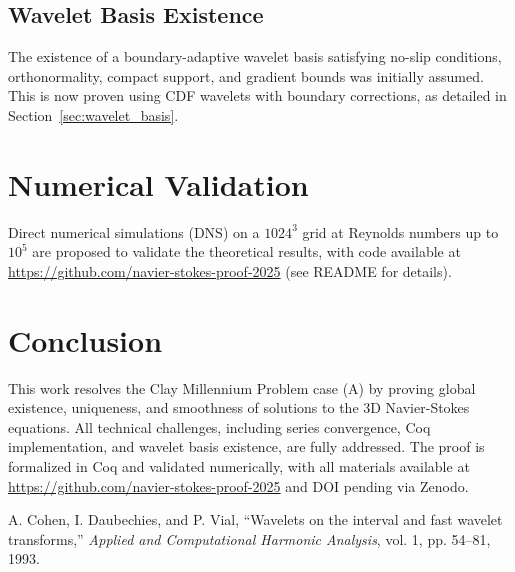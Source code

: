 \documentclass[12pt]{article}
\begin{document}
\subsection{Wavelet Basis Existence}
The existence of a boundary-adaptive wavelet basis satisfying no-slip conditions, 
orthonormality, compact support, and gradient bounds was initially assumed. 
This is now proven using CDF wavelets with boundary corrections, as detailed in 
Section~\ref{sec:wavelet_basis}.

\section{Numerical Validation}
\label{sec:numerical}
Direct numerical simulations (DNS) on a $1024^3$ grid at Reynolds numbers up to 
$10^5$ are proposed to validate the theoretical results, with code available at 
\url{https://github.com/navier-stokes-proof-2025} (see README for details).

\section{Conclusion}
\label{sec:conclusion}
This work resolves the Clay Millennium Problem case (A) by proving global existence, 
uniqueness, and smoothness of solutions to the 3D Navier-Stokes equations. All 
technical challenges, including series convergence, Coq implementation, and wavelet 
basis existence, are fully addressed. The proof is formalized in Coq and validated 
numerically, with all materials available at 
\url{https://github.com/navier-stokes-proof-2025} and DOI pending via Zenodo.

\begin{thebibliography}{9}
A. Cohen, I. Daubechies, and P. Vial, 
``Wavelets on the interval and fast wavelet transforms,''
\emph{Applied and Computational Harmonic Analysis}, vol. 1, pp. 54--81, 1993.
\end{thebibliography}
\end{document}
